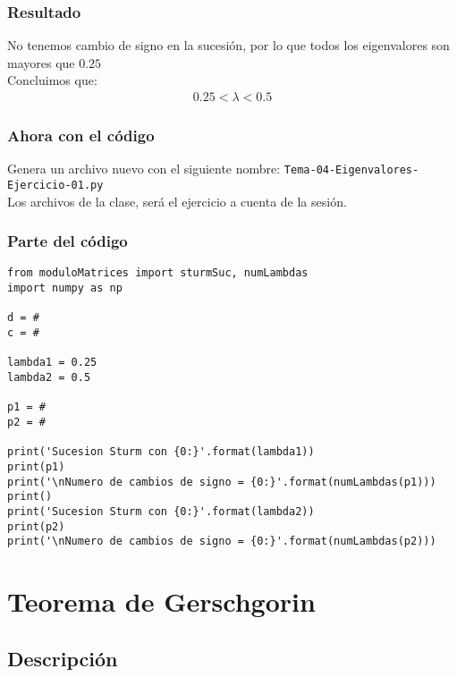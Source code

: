 \documentclass[12pt]{beamer}
\begin{document}
\begin{frame}
\frametitle{Resultado}
No tenemos cambio de signo en la sucesión, por lo que todos los eigenvalores son mayores que $0.25$
\\
\bigskip
\pause
Concluimos que:
\begin{align*}
0.25 < \lambda < 0.5
\end{align*}
\end{frame}
\begin{frame}
\frametitle{Ahora con el código}
Genera un archivo nuevo con el siguiente nombre:
\medskip
\texttt{Tema-04-Eigenvalores-Ejercicio-01.py}
\\
\medskip
\pause
Los archivos de la clase, será el ejercicio a cuenta de la sesión.
\end{frame}
\begin{frame}
\frametitle{Parte del código}
\begin{lstlisting}[caption=Parte del código para la sucesión de Sturm]
from moduloMatrices import sturmSuc, numLambdas
import numpy as np

d = #
c = #

lambda1 = 0.25
lambda2 = 0.5

p1 = #
p2 = #

print('Sucesion Sturm con {0:}'.format(lambda1))
print(p1)
print('\nNumero de cambios de signo = {0:}'.format(numLambdas(p1)))
print()
print('Sucesion Sturm con {0:}'.format(lambda2))
print(p2)
print('\nNumero de cambios de signo = {0:}'.format(numLambdas(p2)))
\end{lstlisting}
\end{frame}

\section{Teorema de Gerschgorin}
\subsection{Descripción}
\end{document}
